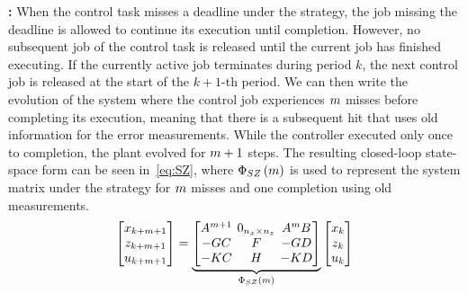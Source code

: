\textbf{\tSZ{}: }%
%
When the control task misses a deadline under the \tS{} strategy, the job missing the deadline is allowed to continue its execution until completion.
However, no subsequent job of the control task is released until the current job has finished executing.
If the currently active job terminates during period $k$, the next control job is released at the start of the $k+1$-th period.
We can then write the evolution of the system where the control job experiences $m$ misses before completing its execution, meaning that there is a subsequent hit that uses old information for the error measurements.
While the controller executed only once to completion, the plant evolved for $m+1$ steps.
The resulting closed-loop state-space form can be seen in~\eqref{eq:SZ}, where $\Phi{}_{SZ}\left( m \right)$ is used to represent the system matrix under the \tSZ{} strategy for $m$ misses and one completion using old measurements.
%
\begin{equation}
\setlength\arraycolsep{2pt}
\label{eq:SZ}
    \begin{bmatrix}
        x_{k+\nummisses+1} \\
        z_{k+\nummisses+1} \\
        u_{k+\nummisses+1}
    \end{bmatrix} = 
    \underbrace{\begin{bmatrix}
        \Ap^{\nummisses+1}  & 0_{n_x \times n_z}  & \Ap^\nummisses \Bp \\
        -\Bc\Cp             & \Ac                                       & -\Bc\Dp \\
        -\Dc\Cp             & \Cc                                       & -\Dc\Dp
    \end{bmatrix}}_{\clmat{}_{SZ}\funof{\nummisses}}
    \begin{bmatrix}
        x_{k} \\
        z_{k} \\
        u_{k}
    \end{bmatrix}
\end{equation}

